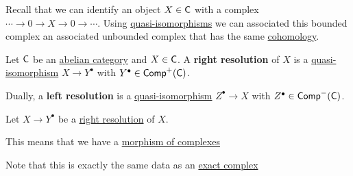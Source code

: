 \documentclass[../../main]{subfiles}
\begin{document}
Recall that we can identify an object \(X \in \category{C}\) with a complex \(\cdots \to  0 \to X \to 0 \to \cdots\).
Using \hyperref[def:quasi-isomorphism]{quasi-isomorphisms} we can associated this bounded complex an associated unbounded complex that has the same \hyperref[def:cohomology]{cohomology}.
\begin{definition}[Resolution]\label{def:resolution}
  Let \(\category{C}\) be an \hyperref[def:abelian-category]{abelian category} and \(X \in \category{C}\).
  A \textbf{right resolution} of \(X\) is a \hyperref[def:quasi-isomorphism]{quasi-isomorphism} \(X \to Y^{\bullet}\) with \(Y^{\bullet} \in \Complex[+]{\category{C}}\).

  Dually, a \textbf{left resolution} is a \hyperref[def:quasi-isomorphism]{quasi-isomorphism} \(Z^{\bullet} \to X\) with \(Z^{\bullet} \in \Complex[-]{\category{C}}\).
\end{definition}

\begin{remark}
  Let \(X \to Y^{\bullet}\) be a \hyperref[def:resolution]{right resolution} of \(X\).

  This means that we have a \hyperref[def:complex]{morphism of complexes}
  \begin{center}
  \end{center}
  Note that this is exactly the same data as an \hyperref[def:exact-sequence]{exact complex}
  \begin{center}
  \end{center}
\end{remark}
\end{document}
